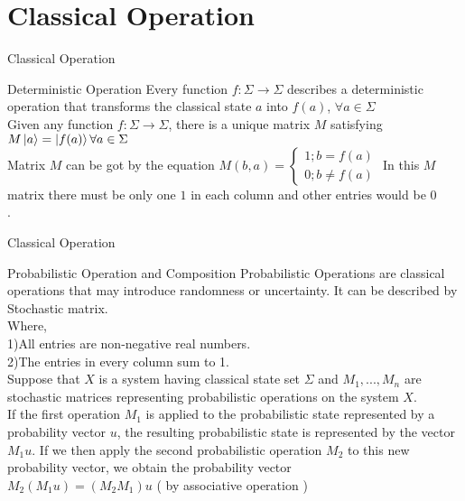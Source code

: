 \documentclass[12pt, aspectratio=169]{beamer}
\begin{document}
\section{Classical Operation}
\begin{frame}{Classical Operation}
    \begin{block}{Deterministic Operation}
        Every function $f : \Sigma \xrightarrow{} \Sigma$ describes a deterministic operation that transforms the classical state $ a $ into $f(a)$, $\forall a \in \Sigma$\\
Given any function $f:\Sigma\xrightarrow{}\Sigma$, there is a unique matrix $M$ satisfying $M\ket{a} = \ket{f(a)} \forall a \in \Sigma$\\
Matrix $M$ can be got by the equation $M(b,a) = \left\{
    \begin{aligned}
    1; b = f(a)\\
    0; b \neq f(a)\end{aligned}
\right.$
In this $M$ matrix there must be only one $1$ in each column and other entries would be $0$\\.
    \end{block}
\end{frame}
    \begin{frame}{Classical Operation}
    \begin{block}{Probabilistic Operation and Composition}
       Probabilistic Operations are classical operations that may introduce randomness or uncertainty. It can be described by Stochastic matrix.\\ Where,\\ 1)All entries are non-negative real numbers. \\ 2)The entries in every column sum to 1.\\

Suppose that $X$ is a system having classical state set $\Sigma$ and $M_{1},...,M_{n}$  are stochastic matrices representing probabilistic operations on the system $X$.\\
If the first operation $M_{1}$ is applied to the probabilistic state represented by a probability vector $u$, the resulting probabilistic state is represented by the vector $M_{1}u$. If we then apply the second probabilistic operation $M_{2}$ to this new probability vector, we obtain the probability vector\\
$M_{2}(M_{1}u) = (M_{2}M_{1})u$  ( by associative operation )
    \end{block}
\end{frame}
\end{document}
